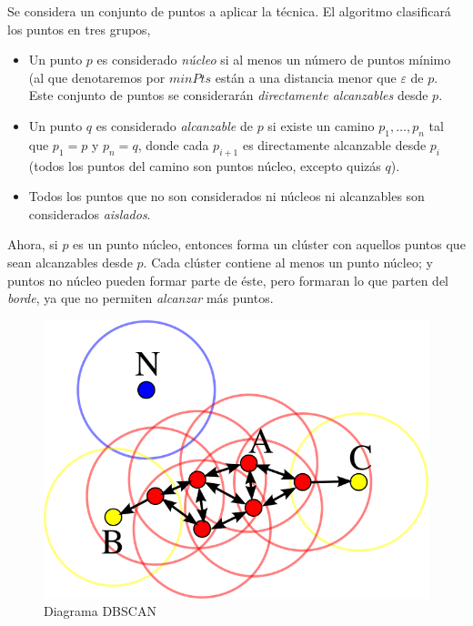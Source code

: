 \documentclass[a4paper, 12pt]{article}
\begin{document}
Se considera un conjunto de puntos a aplicar la t\'ecnica. El algoritmo clasificar\'a los puntos en tres grupos, 

\begin{itemize}
	\item Un punto $p$ es considerado \textit{n\'ucleo} si al menos un n\'umero de puntos m\'inimo (al que denotaremos por $minPts$ est\'an a una distancia menor que $\varepsilon$ de $p$. Este conjunto de puntos se considerar\'an \textit{directamente alcanzables} desde $p$.
	\item Un punto $q$ es considerado \textit{alcanzable} de $p$ si existe un camino $p_1, \ldots, p_n$ tal que $p_1=p$ y $p_n=q$, donde cada $p_{i+1}$ es directamente alcanzable desde $p_i$ (todos los puntos del camino son puntos n\'ucleo, excepto quiz\'as $q$).
	\item Todos los puntos que no son considerados ni n\'ucleos ni alcanzables son considerados \textit{aislados}.
\end{itemize}

Ahora, si $p$ es un punto n\'ucleo, entonces forma un cl\'uster con aquellos puntos que sean alcanzables desde $p$. Cada cl\'uster contiene al menos un punto n\'ucleo; y puntos no n\'ucleo pueden formar parte de \'este, pero formaran lo que parten del \textit{borde}, ya que no permiten \textit{alcanzar} m\'as puntos. \\

\begin{figure}[H]\label{fig:DBSCAN}
	\centering
	\includegraphics[scale=.5]{DBSCAN.png}
\caption{Diagrama DBSCAN}
\end{figure}
\end{document}
